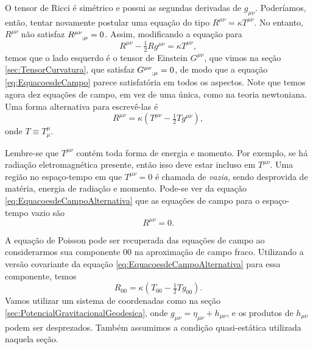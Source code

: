 O tensor de Ricci é simétrico e possui as segundas derivadas de $g_{\mu\nu}$. Poderíamos, então, tentar novamente postular uma equação do tipo $R^{\mu\nu}= \kappa T^{\mu\nu}$. No entanto, $R^{\mu\nu}$ não satisfaz $\tensor{R}{^{\mu\nu}_{;\mu}}=0$. Assim, modificando a equação para
\begin{equation}\label{eq:EquacoesdeCampo}
	\boxed{
		R^{\mu\nu}-\tfrac{1}{2}Rg^{\mu\nu}=\kappa T^{\mu\nu} ,
	}
\end{equation}
temos que o lado esquerdo é o tensor de Einstein $G^{\mu\nu}$, que vimos na seção \ref{sec:TensorCurvatura}, que satisfaz $\tensor{G}{^{\mu\nu}_{;\mu}}=0$, de modo que a equação \eqref{eq:EquacoesdeCampo} parece satisfatória em todos os aspectos. Note que temos agora dez equações de campo, em vez de uma única, como na teoria newtoniana. Uma forma alternativa para escrevê-las é
\begin{equation}\label{eq:EquacoesdeCampoAlternativa}
	R^{\mu\nu}=\kappa(T^{\mu\nu}-\tfrac{1}{2}Tg^{\mu\nu}) ,
\end{equation}
onde $T \equiv T^\mu_\mu$.

Lembre-se que $T^{\mu\nu}$ contém toda forma de energia e momento. Por exemplo, se há radiação eletromagnética presente, então isso deve estar incluso em $T^{\mu\nu}$. Uma região no espaço-tempo em que $T^{\mu\nu}=0$ é chamada de \textit{vazia}, sendo desprovida de matéria, energia de radiação e momento. Pode-se ver da equação \eqref{eq:EquacoesdeCampoAlternativa} que as equações de campo para o espaço-tempo vazio são
\begin{equation}\label{eq:EquacoesCampoVazio}
	R^{\mu\nu}=0.
\end{equation}

A equação de Poisson pode ser recuperada das equações de campo ao considerarmos sua componente $00$ na aproximação de campo fraco. Utilizando a versão covariante da equação \eqref{eq:EquacoesdeCampoAlternativa} para essa componente, temos
\begin{equation}\label{eq:EquacaoCampo00}
	R_{00}=\kappa(T_{00}-\tfrac{1}{2}Tg_{00}).
\end{equation}
Vamos utilizar um sistema de coordenadas como na seção \ref{sec:PotencialGravitacionalGeodesica}, onde $g_{\mu\nu}=\eta_{\mu\nu}+h_{\mu\nu}$, e os produtos de $h_{\mu\nu}$ podem ser desprezados. Também assumimos a condição quasi-estática utilizada naquela seção.

